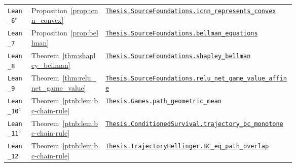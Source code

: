{\begin{longtable}{@{}l l >{\raggedright\arraybackslash}p{0.66\linewidth}@{}}
\texttt{Lean\_6}$^{\mathrm c}$ & Proposition~\ref{prop:icnn_convex} & \href{https://github.com/JayPiZimmermann/A-Structural-Approach-to-Explainable-Deep-Learning/blob/b1c18a7ed02eadd720b0b693794ba7e7dd2628f6/formalization/Thesis/SourceFoundationsStatements.lean\#L26}{\texttt{Thesis.\allowbreak SourceFoundations.\allowbreak icnn\_represents\_convex}} \\
\texttt{Lean\_7} & Proposition~\ref{prop:bellman} & \href{https://github.com/JayPiZimmermann/A-Structural-Approach-to-Explainable-Deep-Learning/blob/b1c18a7ed02eadd720b0b693794ba7e7dd2628f6/formalization/Thesis/SourceFoundationsStatements.lean\#L61}{\texttt{Thesis.\allowbreak SourceFoundations.\allowbreak bellman\_equations}} \\
\texttt{Lean\_8} & Theorem~\ref{thm:shapley_bellman} & \href{https://github.com/JayPiZimmermann/A-Structural-Approach-to-Explainable-Deep-Learning/blob/b1c18a7ed02eadd720b0b693794ba7e7dd2628f6/formalization/Thesis/SourceFoundationsStatements.lean\#L78}{\texttt{Thesis.\allowbreak SourceFoundations.\allowbreak shapley\_bellman}} \\
\texttt{Lean\_9} & Theorem~\ref{thm:relu_net_game_value} & \href{https://github.com/JayPiZimmermann/A-Structural-Approach-to-Explainable-Deep-Learning/blob/b1c18a7ed02eadd720b0b693794ba7e7dd2628f6/formalization/Thesis/SourceFoundationsStatements.lean\#L248}{\texttt{Thesis.\allowbreak SourceFoundations.\allowbreak relu\_net\_game\_value\_affine}} \\
\texttt{Lean\_10}$^{\mathrm c}$ & Theorem~\ref{ptnb:lem:bc-chain-rule} & \href{https://github.com/JayPiZimmermann/A-Structural-Approach-to-Explainable-Deep-Learning/blob/b1c18a7ed02eadd720b0b693794ba7e7dd2628f6/formalization/Thesis/Games.lean\#L197}{\texttt{Thesis.\allowbreak Games.\allowbreak path\_geometric\_mean}} \\
\texttt{Lean\_11}$^{\mathrm c}$ & Theorem~\ref{ptnb:lem:bc-chain-rule} & \href{https://github.com/JayPiZimmermann/A-Structural-Approach-to-Explainable-Deep-Learning/blob/b1c18a7ed02eadd720b0b693794ba7e7dd2628f6/formalization/Thesis/ConditionedTrajectory.lean\#L246}{\texttt{Thesis.\allowbreak ConditionedSurvival.\allowbreak trajectory\_bc\_monotone}} \\
\texttt{Lean\_12} & Theorem~\ref{ptnb:lem:bc-chain-rule} & \href{https://github.com/JayPiZimmermann/A-Structural-Approach-to-Explainable-Deep-Learning/blob/b1c18a7ed02eadd720b0b693794ba7e7dd2628f6/formalization/Thesis/TrajectoryHellinger.lean\#L156}{\texttt{Thesis.\allowbreak TrajectoryHellinger.\allowbreak BC\_eq\_path\_overlap}} \\

\end{longtable}}
